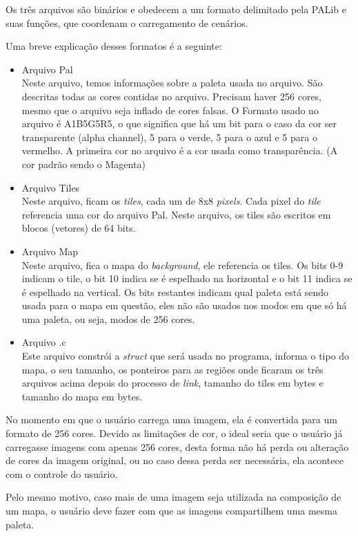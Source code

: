\documentclass[brazil]{abnt}
\begin{document}
Os três arquivos são binários e obedecem a um formato delimitado pela PALib e suas funções, que coordenam o carregamento de cenários.

Uma breve explicação desses formatos é a seguinte:

\begin{itemize}
 \item Arquivo Pal\\
 Neste arquivo, temos informações sobre a paleta usada no arquivo. São descritas todas as cores contidas no arquivo. Precisam haver 256 cores, mesmo que o arquivo seja inflado de cores falsas. O Formato usado no arquivo é A1B5G5R5, o que significa que há um bit para o caso da cor ser transparente (alpha channel), 5 para o verde, 5 para o azul e 5 para o vermelho. A primeira cor no arquivo é a cor usada como transparência. (A cor padrão sendo o Magenta)\label{exp:A1B5G5R5}
 \item Arquivo Tiles\\
 Neste arquivo, ficam os \textit{tiles}, cada um de 8x8 \textit{pixels}. Cada pixel do \textit{tile} referencia uma cor do arquivo Pal. Neste arquivo, os tiles são escritos em blocos (vetores) de 64 bits. 
 \item Arquivo Map\\
 Neste arquivo, fica o mapa do \textit{background}, ele referencia os tiles. Os bits 0-9 indicam o tile, o bit 10 indica se é espelhado na horizontal e o bit 11 indica se é espelhado na vertical. Os bits restantes indicam qual paleta está sendo usada para o mapa em questão, eles não são usados nos modos em que só há uma paleta, ou seja, modos de 256 cores.
 \item Arquivo .c\\
 Este arquivo constrói a \textit{struct} que será usada no programa, informa o tipo do mapa, o seu tamanho, os ponteiros para as regiões onde ficaram os três arquivos acima depois do processo de \textit{link}, tamanho do tiles em bytes e tamanho do mapa em bytes. 
\end{itemize}

No momento em que o usuário carrega uma imagem, ela é convertida para um formato de 256 cores. Devido as limitações de cor, o ideal seria que o usuário já carregasse imagens com apenas 256 cores, desta forma não há perda ou alteração de cores da imagem original, ou no caso dessa perda ser necessária, ela acontece com o controle do usuário.

Pelo mesmo motivo, caso mais de uma imagem seja utilizada na composição de um mapa, o usuário deve fazer com que as imagens compartilhem uma mesma paleta.
\end{document}
